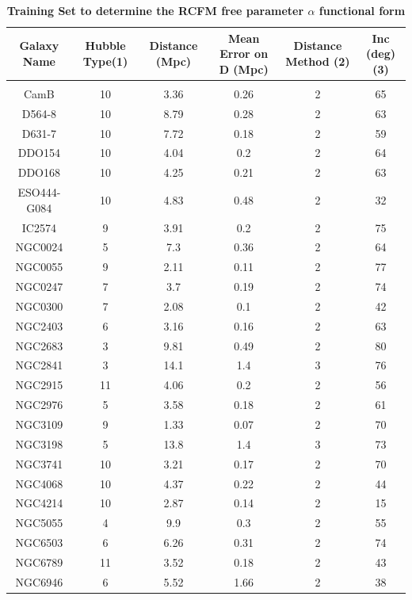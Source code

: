 \documentclass[reprint,%
 amsmath,amssymb,
 aps,
]{revtex4-1}
\begin{document}
 

  \begin{table}[]
      \centering
      \caption{\textbf{ 
Training Set to determine the RCFM free parameter $\alpha$  functional form  } } 
      \begin{tabular}{|c|c|c|c|c|c|}
      \hline \hline
\rowcolor[HTML]{CCCCCC} 
\textbf{Galaxy Name} & Hubble Type(1)& 	Distance (Mpc)&Mean Error on D (Mpc)& 	Distance Method (2)& 	Inc (deg)(3)\\
    \hline \hline\\
CamB&   	10&    3.36&  	0.26&   2&  65\\
D564-8& 	10& 	8.79& 	0.28& 	2& 	63\\
D631-7& 	10& 	7.72& 	0.18& 	2& 	59\\
DDO154& 	10& 	4.04& 	0.2& 	2& 	64\\
DDO168& 	10& 	4.25& 	0.21& 	2& 	63\\
ESO444-G084& 10& 	4.83& 	0.48& 	2& 	32\\
IC2574& 	9& 	3.91& 	0.2&    	2& 	75\\
NGC0024& 	5& 	7.3& 	0.36&   	2& 	64\\
NGC0055& 	9& 	2.11& 	0.11&   	2& 	77\\
NGC0247& 	7& 	3.7& 	0.19&   	2& 	74\\
NGC0300& 	7& 	2.08& 	0.1&    	2& 	42\\
NGC2403& 	6& 	3.16& 	0.16&   	2& 	63\\
NGC2683& 	3& 	9.81& 	0.49&   	2& 	80\\
NGC2841& 	3& 	14.1& 	1.4&    	3& 	76\\
NGC2915& 	11& 	4.06& 	0.2& 	2& 	56\\
NGC2976& 	5& 	3.58& 	0.18&   	2& 	61\\
NGC3109& 	9& 	1.33& 	0.07&   	2& 	70\\
NGC3198& 	5& 	13.8& 	1.4&    	3& 	73\\
NGC3741& 	10& 	3.21& 	0.17& 	2& 	70\\
NGC4068& 	10& 	4.37& 	0.22& 	2& 	44\\
NGC4214& 	10& 	2.87& 	0.14& 	2& 	15\\
NGC5055& 	4& 	9.9& 	0.3&    	2& 	55\\
NGC6503& 	6& 	6.26& 	0.31&   	2& 	74\\
NGC6789& 	11& 	3.52& 	0.18& 	2& 	43\\
NGC6946& 	6& 	5.52& 	1.66&   	2& 	38\\

\end{tabular}
\end{table}
\end{document}
